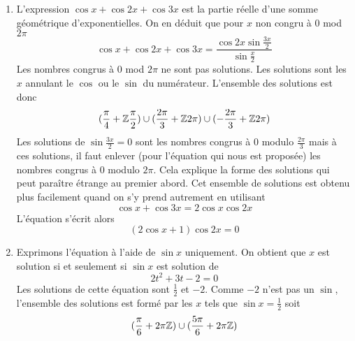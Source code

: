 \begin{enumerate}
\item L'expression $\cos x +\cos 2x +\cos 3x$ est la partie réelle d'une somme géométrique d'exponentielles. On en déduit que pour $x$ non congru à 0 mod $2\pi$
\[\cos x +\cos 2x +\cos 3x=\frac{\cos 2x \sin \frac{3x}{2}}{\sin \frac{x}{2}}\]
Les nombres congrus à 0 mod $2\pi$ ne sont pas solutions. Les solutions sont les $x$ annulant le $\cos$ ou le $\sin$ du numérateur. L'ensemble des solutions est donc
\[(\frac{\pi}{4}+\mathbb{Z} \frac{\pi}{2})\cup(\frac{2\pi}{3}+\mathbb{Z} 2\pi)\cup(-\frac{2\pi}{3}+\mathbb{Z} 2\pi)\]
Les solutions de $\sin\frac{3x}{2}=0$ sont les nombres congrus à $0$ modulo $\frac{2\pi}{3}$ mais à ces solutions, il faut enlever (pour l'équation qui nous est proposée) les nombres congrus à $0$ modulo $2\pi$. Cela explique la forme des solutions qui peut paraître étrange au premier abord.\newline
Cet ensemble de solutions est obtenu plus facilement quand on s'y prend autrement en utilisant
\begin{displaymath}
 \cos x + \cos 3x = 2\cos x \cos 2x
\end{displaymath}
L'équation s'écrit alors
\begin{displaymath}
 \left(2\cos x +1 \right) \cos 2x = 0
\end{displaymath}

\item Exprimons l'équation à l'aide de $\sin x$ uniquement. On obtient que $x$ est solution si et seulement si $\sin x$ est solution de
\[2t^2+3t-2=0\]
Les solutions de cette équation sont $\frac{1}{2}$ et $-2$. Comme $-2$ n'est pas un $\sin$, l'ensemble des solutions est formé par les $x$ tels que $\sin x = \frac{1}{2}$ soit
\[(\frac{\pi}{6}+2\pi \mathbb{Z})\cup(\frac{5\pi}{6}+2\pi \mathbb{Z})\]
\end{enumerate} 

